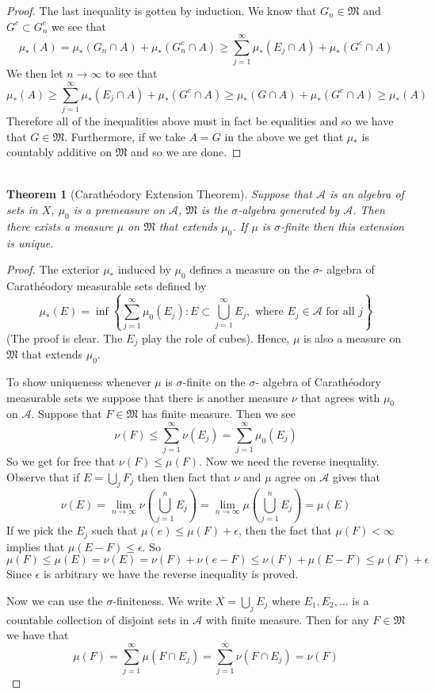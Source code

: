 \documentclass{article}
\DeclareMathOperator{\suchthat}{\mathrel{:}}
\newtheorem*{thm}{\\ Theorem}
\begin{document}
\begin{proof}
  The last inequality is gotten by induction. We know that $G_n \in
  \mathfrak{M}$ and $G^c \subset G_n^c$ we see that
  \[
  \mu_*(A) = \mu_*(G_n \cap A) + \mu_*(G_n^c \cap A) \geq \sum_{j=1}^\infty
  \mu_*(E_j \cap A) + \mu_*(G^c \cap A)
  \]
  We then let $n \to \infty$ to see that
  \[
  \mu_*(A) \geq  \sum_{j=1}^\infty \mu_*(E_j \cap A) + \mu_*(G^c \cap A) \geq
  \mu_*(G \cap A) + \mu_*(G^c \cap A) \geq \mu_*(A)
  \]
  Therefore all of the inequalities above must in fact be equalities and so
  we have that $G \in \mathfrak{M}$. Furthermore, if we take $A = G$ in the
  above we get that $\mu_*$ is countably additive on $\mathfrak{M}$ and so
  we are done.
\end{proof}

\begin{thm}[Carath\'{e}odory Extension Theorem]
  Suppose that $\mathcal{A}$ is an algebra of sets in $X$, $\mu_0$ is a
  premeasure on $\mathcal{A}$, $\mathfrak{M}$ is the $\sigma$-algebra
  generated by $\mathcal{A}$. Then there exists a measure $\mu$ on $
  \mathfrak{M}$ that extends $\mu_0$. If $\mu$ is $\sigma$-finite then this
  extension is unique.
\end{thm}
\begin{proof}
  The exterior $\mu_*$ induced by $\mu_0$ defines a measure on the $\sigma$-
  algebra of Carath\'{e}odory measurable sets defined by
  \[
  \mu_*(E) = \inf \left\{ \sum_{j=1}^\infty \mu_0(E_j) \suchthat E \subset
    \bigcup_{j=1}^\infty E_j, \text{ where } E_j \in \mathcal{A} \text{ for
       all } j\right\}
  \]
  (The proof is clear. The $E_j$ play the role of cubes). Hence, $\mu$ is
  also a measure on $\mathfrak{M}$ that extends $\mu_0$.

  To show uniqueness whenever $\mu$ is $\sigma$-finite on the $\sigma$-
  algebra of Carath\'{e}odory measurable sets we suppose that there is
  another measure $\nu$ that agrees with $\mu_0$ on $\mathcal{A}$. Suppose
  that $F \in \mathfrak{M}$ has finite measure. Then we see
  \[
  \nu(F) \leq \sum_{j=1}^\infty \nu(E_j) = \sum_{j=1}^\infty \mu_0(E_j)
  \]
  So we get for free that $\nu(F) \leq \mu(F)$. Now we need the reverse
  inequality. Observe that if $E = \bigcup_j F_j$ then then fact that $\nu$
  and $\mu$ agree on $\mathcal{A}$ gives that
  \[
  \nu(E) = \lim_{n\to\infty}\nu\left(\bigcup_{j=1}^n E_j\right) = \lim_{n\to
    \infty} \mu\left(\bigcup_{j=1}^n E_j\right) = \mu(E)
  \]
  If we pick the $E_j$ such that $\mu(e) \leq \mu(F) + \epsilon$, then the
  fact that $\mu(F) < \infty$ implies that $\mu(E-F) \leq \epsilon$. So
  \[
  \mu(F) \leq \mu(E) = \nu(E) = \nu(F) + \nu (e-F) \leq \nu(F) + \mu(E-F)
  \leq \mu(F) + \epsilon
  \]
  Since $\epsilon$ is arbitrary we have the reverse inequality is proved.

  Now we can use the $\sigma$-finiteness. We write $X = \bigcup_j E_j$ where
  $E_1, E_2,\ldots$ is a countable collection of disjoint sets in $
  \mathcal{A}$ with finite measure. Then for any $F \in \mathfrak{M}$ we have
  that
  \[
  \mu(F) = \sum_{j=1}^\infty \mu(F\cap E_j) = \sum_{j=1}^\infty \nu(F\cap E_j) =
  \nu(F)
  \]
\end{proof}
\end{document}
